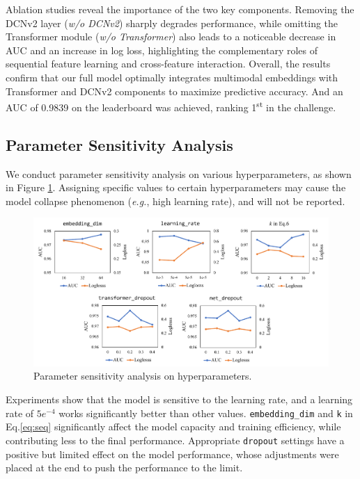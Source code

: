 \documentclass[sigconf, nonacm, screen]{acmart}
\begin{document}
Ablation studies reveal the importance of the two key components.
Removing the DCNv2 layer (\emph{w/o DCNv2}) sharply degrades performance, while omitting the Transformer module (\emph{w/o Transformer}) also leads to a noticeable decrease in AUC and an increase in log loss, highlighting the complementary roles of sequential feature learning and cross-feature interaction. 
Overall, the results confirm that our full model optimally integrates multimodal embeddings with Transformer and DCNv2 components to maximize predictive accuracy.
And an AUC of 0.9839 on the leaderboard was achieved, ranking 1\textsuperscript{st} in the challenge.

\subsection{Parameter Sensitivity Analysis}
We conduct parameter sensitivity analysis on various hyperparameters, as shown in Figure \ref{fig:ps}.
Assigning specific values to certain hyperparameters may cause the model collapse phenomenon (\emph{e.g.}, high learning rate), and will not be reported.

\begin{figure}[t!]
  \centering
  \includegraphics[width=0.82\linewidth]{assets/ps.pdf}
  \caption{Parameter sensitivity analysis on hyperparameters.}
  \label{fig:ps}
\end{figure}

Experiments show that the model is sensitive to the learning rate, and a learning rate of \(5e^{-4}\) works significantly better than other values.
\texttt{embedding\_dim} and \texttt{k} in Eq.\ref{eq:seq} significantly affect the model capacity and training efficiency, while contributing less to the final performance.
Appropriate \texttt{dropout} settings have a positive but limited effect on the model performance, whose adjustments were placed at the end to push the performance to the limit.
\end{document}
